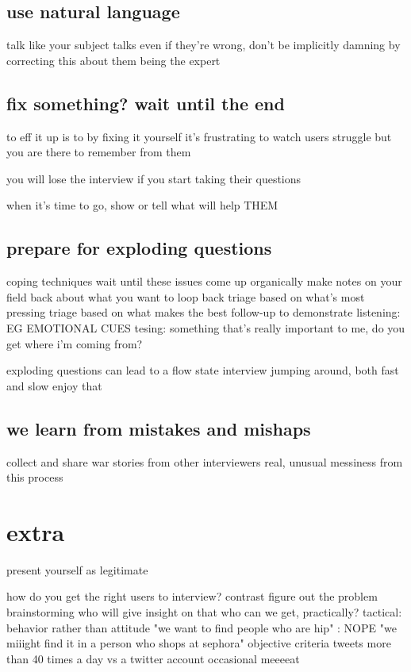 \documentclass{article}
\begin{document}
\subsection{use natural language}
talk like your subject talks
even if they're wrong, don't be implicitly damning by correcting
this about them being the expert

\subsection{fix something? wait until the end}
to eff it up is to by fixing it yourself
it's frustrating to watch users struggle but you are there to remember from them

you will lose the interview if you start taking their questions

when it's time to go, show or tell what will help THEM

\subsection{prepare for exploding questions}
coping techniques
wait until these issues come up organically
make notes on your field back about what you want to loop back
triage based on what's most pressing
triage based on what makes the best follow-up to demonstrate listening: EG EMOTIONAL CUES
tesing: something that's really important to me, do you get where i'm coming from?

exploding questions can lead to a flow state
interview jumping around, both fast and slow
enjoy that

\subsection{we learn from mistakes and mishaps}
collect and share war stories from other interviewers
real, unusual messiness from this process

\section{extra}
present yourself as legitimate

how do you get the right users to interview?
contrast
figure out the problem
brainstorming who will give insight on that
who can we get, practically?
tactical: behavior rather than attitude
"we want to find people who are hip" : NOPE
"we miiight find it in a person who shops at sephora"
objective criteria
tweets more than 40 times a day vs a twitter account occasional
meeeeat
\end{document}
